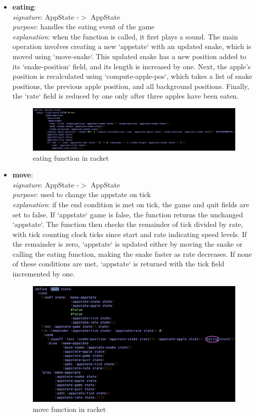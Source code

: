 \documentclass{article}
\begin{document}
\begin{itemize}
		\item \textbf{eating}: \\
			\emph{signature}: AppState -$>$ AppState \\
			\emph{purpose}: handles the eating event of the game \\
			\emph{explanation}: when the function is called, it first plays a sound. The main operation involves creating a new `appstate` with an updated snake, which is moved using `move-snake`. This updated snake has a new position added to its `snake-position` field, and its length is increased by one. Next, the apple's position is recalculated using `compute-apple-pos`, which takes a list of snake positions, the previous apple position, and all background positions. Finally, the `rate` field is reduced by one only after three apples have been eaten.
			\begin{figure}[h!]
				\centering
				\includegraphics[width=.6\linewidth]{eating.png}
				\caption{eating function in racket}
			\end{figure}
			
		\item \textbf{move}: \\
			\emph{signature}: AppState -$>$ AppState \\
			\emph{purpose}: used to change the appstate on tick \\
			\emph{explanation}: if the end condition is met on tick, the game and quit fields are set to false. If `appstate` game is false, the function returns the unchanged `appstate`. The function then checks the remainder of tick divided by rate, with tick counting clock ticks since start and rate indicating speed levels. If the remainder is zero, `appstate` is updated either by moving the snake or calling the eating function, making the snake faster as rate decreases. If none of these conditions are met, `appstate` is returned with the tick field incremented by one.
			\begin{figure}[h!]
				\centering
				\includegraphics[width=.6\linewidth]{move.png}
				\caption{move function in racket}
			\end{figure}
			

\end{itemize}
\end{document}
